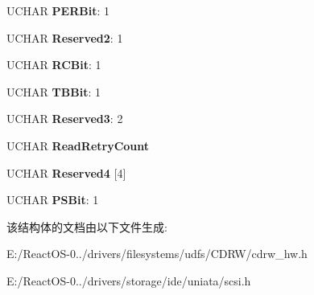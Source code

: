 \begin{DoxyCompactItemize}
\mbox{\label{struct___m_o_d_e___r_e_a_d___r_e_c_o_v_e_r_y___p_a_g_e_a712d05594b811dbb0446753e849d558e}} 
U\+C\+H\+AR {\bfseries P\+E\+R\+Bit}\+: 1
\item 
\mbox{\label{struct___m_o_d_e___r_e_a_d___r_e_c_o_v_e_r_y___p_a_g_e_acfa4fbd6cc628d08fab034da8f412ae5}} 
U\+C\+H\+AR {\bfseries Reserved2}\+: 1
\item 
\mbox{\label{struct___m_o_d_e___r_e_a_d___r_e_c_o_v_e_r_y___p_a_g_e_ae3e1ca60311ff7ffa3f22011c5dee614}} 
U\+C\+H\+AR {\bfseries R\+C\+Bit}\+: 1
\item 
\mbox{\label{struct___m_o_d_e___r_e_a_d___r_e_c_o_v_e_r_y___p_a_g_e_a4ea4fbe801aa4fd4f0e165891dffcacc}} 
U\+C\+H\+AR {\bfseries T\+B\+Bit}\+: 1
\item 
\mbox{\label{struct___m_o_d_e___r_e_a_d___r_e_c_o_v_e_r_y___p_a_g_e_a54353a8f5ebde4e6adf7854a8e649cc1}} 
U\+C\+H\+AR {\bfseries Reserved3}\+: 2
\item 
\mbox{\label{struct___m_o_d_e___r_e_a_d___r_e_c_o_v_e_r_y___p_a_g_e_a6bb7f7b3ccea52503c2bda6f9f0ae92a}} 
U\+C\+H\+AR {\bfseries Read\+Retry\+Count}
\item 
\mbox{\label{struct___m_o_d_e___r_e_a_d___r_e_c_o_v_e_r_y___p_a_g_e_af6983b3db2d4b53a77a12955b7fc5b35}} 
U\+C\+H\+AR {\bfseries Reserved4} \mbox{[}4\mbox{]}
\item 
\mbox{\label{struct___m_o_d_e___r_e_a_d___r_e_c_o_v_e_r_y___p_a_g_e_abc15e5de3301f6d29509219f08f0d32d}} 
U\+C\+H\+AR {\bfseries P\+S\+Bit}\+: 1
\end{DoxyCompactItemize}


该结构体的文档由以下文件生成\+:\begin{DoxyCompactItemize}
\item 
E\+:/\+React\+O\+S-\/0../drivers/filesystems/udfs/\+C\+D\+R\+W/cdrw\+\_\+hw.\+h\item 
E\+:/\+React\+O\+S-\/0../drivers/storage/ide/uniata/scsi.\+h\end{DoxyCompactItemize}
